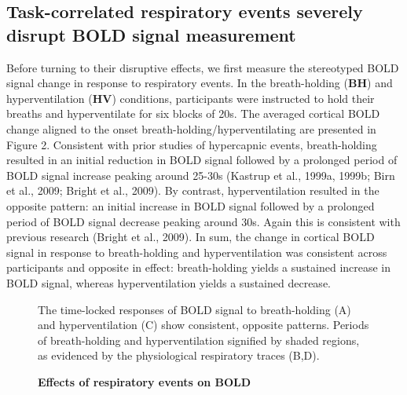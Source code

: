 \documentclass[9pt]{NEU502b-fmri}
\begin{document}
\subsection{Task-correlated respiratory events severely disrupt BOLD signal measurement}
Before turning to their disruptive effects, we first measure the stereotyped BOLD signal change in response to respiratory events. In the breath-holding (\textbf{BH}) and hyperventilation (\textbf{HV}) conditions, participants were instructed to hold their breaths and hyperventilate for six blocks of 20s. The averaged cortical BOLD change aligned to the onset breath-holding/hyperventilating are presented in Figure 2. Consistent with prior studies of hypercapnic events, breath-holding resulted in an initial reduction in BOLD signal followed by a prolonged period of BOLD signal increase peaking around 25-30s (Kastrup et al., 1999a, 1999b; Birn et al., 2009; Bright et al., 2009). By contrast, hyperventilation resulted in the opposite pattern: an initial increase in BOLD signal followed by a prolonged period of BOLD signal decrease peaking around 30s. Again this is consistent with previous research (Bright et al., 2009). In sum, the change in cortical BOLD signal in response to breath-holding and hyperventilation was consistent across participants and opposite in effect: breath-holding yields a sustained increase in BOLD signal, whereas hyperventilation yields a sustained decrease.

\begin{figure}
\centerline{%
%
}
\caption{\textbf{Effects of respiratory events on BOLD}}
\par The time-locked responses of BOLD signal to breath-holding (A) and hyperventilation (C) show consistent, opposite patterns. Periods of breath-holding and hyperventilation signified by shaded regions, as evidenced by the physiological respiratory traces (B,D).

\end{figure}
\end{document}
